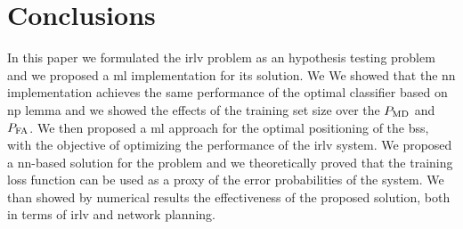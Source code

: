 \documentclass[twocolumns]{IEEEtran}
\begin{document}
\section{Conclusions}
In this paper we formulated the \ac{irlv} problem as an hypothesis testing problem and we proposed a \ac{ml} implementation for its solution. We We showed that the \ac{nn} implementation achieves the same performance of the optimal classifier based on \ac{np} lemma and we showed the effects of the training set size over the $P_{\rm MD}$ and $P_{\rm FA}$. We then proposed a \ac{ml} approach for the optimal positioning of the \acp{bs}, with the objective of optimizing the performance of the \ac{irlv} system. We proposed a \ac{nn}-based solution for the problem and we theoretically proved that the training loss function can be used as a proxy of the error probabilities of the system. We than showed by numerical results the effectiveness of the proposed solution, both in terms of \ac{irlv} and network planning.
\renewcommand*{\bibfont}{\footnotesize}

\printbibliography
\balance
\end{document}
